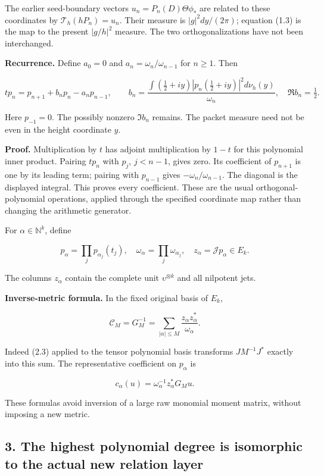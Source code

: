 \documentclass[
]{article}
\begin{document}
The earlier seed-boundary vectors \(u_n=P_n(D)\Theta\phi_*\) are related
to these coordinates by \(\mathcal T_h(hP_n)=u_n\). Their measure is
\(|g|^2dy/(2\pi)\); equation (1.3) is the map to the present \(|g/h|^2\)
measure. The two orthogonalizations have not been interchanged.

\textbf{Recurrence.} Define \(a_0=0\) and \(a_n=\omega_n/\omega_{n-1}\)
for \(n\ge1\). Then

\[\boxed{tp_n=p_{n+1}+b_np_n-a_np_{n-1},\qquad
b_n=\frac{\int(\tfrac12+iy)|p_n(\tfrac12+iy)|^2d\nu_h(y)}{\omega_n},\quad \Re b_n=\tfrac12.}\tag{2.4}\]

Here \(p_{-1}=0\). The possibly nonzero \(\Im b_n\) remains. The packet
measure need not be even in the height coordinate \(y\).

\textbf{Proof.} Multiplication by \(t\) has adjoint multiplication by
\(1-t\) for this polynomial inner product. Pairing \(tp_n\) with
\(p_j\), \(j<n-1\), gives zero. Its coefficient of \(p_{n+1}\) is one by
its leading term; pairing with \(p_{n-1}\) gives
\(-\omega_n/\omega_{n-1}\). The diagonal is the displayed integral. This
proves every coefficient. These are the usual orthogonal-polynomial
operations, applied through the specified coordinate map rather than
changing the arithmetic generator.

For \(\alpha\in\mathbb N^k\), define

\[p_\alpha=\prod_jp_{\alpha_j}(t_j),\quad
\omega_\alpha=\prod_j\omega_{\alpha_j},\quad
z_\alpha=\mathcal Jp_\alpha\in E_k.\tag{2.5}\]

The columns \(z_\alpha\) contain the complete unit
\(\upsilon^{\otimes k}\) and all nilpotent jets.

\textbf{Inverse-metric formula.} In the fixed original basis of \(E_k\),

\[\boxed{\mathcal C_M=G_M^{-1}=\sum_{|\alpha|\le M}\frac{z_\alpha z_\alpha^*}{\omega_\alpha}.}\tag{2.6}\]

Indeed (2.3) applied to the tensor polynomial basis transforms
\(J M^{-1}J^*\) exactly into this sum. The representative coefficient on
\(p_\alpha\) is

\[\boxed{c_\alpha(u)=\omega_\alpha^{-1}z_\alpha^*G_Mu.}\tag{2.7}\]

These formulas avoid inversion of a large raw monomial moment matrix,
without imposing a new metric.

\subsection{3. The highest polynomial degree is isomorphic to the actual
new relation
layer}\label{the-highest-polynomial-degree-is-isomorphic-to-the-actual-new-relation-layer}
\end{document}
